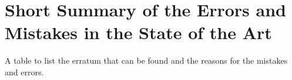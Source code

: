 \section{Short Summary of the Errors and Mistakes in the State of the Art}
  
  A table to list the erratum that can be found and the reasons for the mistakes and errors.